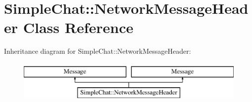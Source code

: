 \hypertarget{classSimpleChat_1_1NetworkMessageHeader}{\section{Simple\-Chat\-:\-:Network\-Message\-Header Class Reference}
\label{classSimpleChat_1_1NetworkMessageHeader}
}
Inheritance diagram for Simple\-Chat\-:\-:Network\-Message\-Header\-:\begin{figure}[H]
\begin{center}
\leavevmode
\includegraphics[height=2.000000cm]{classSimpleChat_1_1NetworkMessageHeader}
\end{center}
\end{figure}
